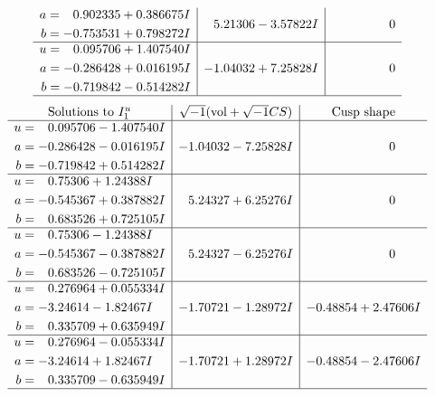 \documentclass[1p]{elsarticle_modified}
\theoremstyle{definition}
\newcommand{\I}{\sqrt{-1}}
\begin{document}
$$\begin{array}{c|c|c}
\begin{aligned}
a &= \phantom{-}0.902335 + 0.386675 I \\
b &= -0.753531 + 0.798272 I\end{aligned}
 & \phantom{-}5.21306 - 3.57822 I & \phantom{-0.000000 } 0 \\ \hline\begin{aligned}
u &= \phantom{-}0.095706 + 1.407540 I \\
a &= -0.286428 + 0.016195 I \\
b &= -0.719842 - 0.514282 I\end{aligned}
 & -1.04032 + 7.25828 I & \phantom{-0.000000 } 0\\
 \hline 
 \end{array}$$\newpage$$\begin{array}{c|c|c}  
\text{Solutions to }I^u_{1}& \I (\text{vol} + \sqrt{-1}CS) & \text{Cusp shape}\\
 \hline 
\begin{aligned}
u &= \phantom{-}0.095706 - 1.407540 I \\
a &= -0.286428 - 0.016195 I \\
b &= -0.719842 + 0.514282 I\end{aligned}
 & -1.04032 - 7.25828 I & \phantom{-0.000000 } 0 \\ \hline\begin{aligned}
u &= \phantom{-}0.75306 + 1.24388 I \\
a &= -0.545367 + 0.387882 I \\
b &= \phantom{-}0.683526 + 0.725105 I\end{aligned}
 & \phantom{-}5.24327 + 6.25276 I & \phantom{-0.000000 } 0 \\ \hline\begin{aligned}
u &= \phantom{-}0.75306 - 1.24388 I \\
a &= -0.545367 - 0.387882 I \\
b &= \phantom{-}0.683526 - 0.725105 I\end{aligned}
 & \phantom{-}5.24327 - 6.25276 I & \phantom{-0.000000 } 0 \\ \hline\begin{aligned}
u &= \phantom{-}0.276964 + 0.055334 I \\
a &= -3.24614 - 1.82467 I \\
b &= \phantom{-}0.335709 + 0.635949 I\end{aligned}
 & -1.70721 - 1.28972 I & -0.48854 + 2.47606 I \\ \hline\begin{aligned}
u &= \phantom{-}0.276964 - 0.055334 I \\
a &= -3.24614 + 1.82467 I \\
b &= \phantom{-}0.335709 - 0.635949 I\end{aligned}
 & -1.70721 + 1.28972 I & -0.48854 - 2.47606 I\\
 \hline 
 \end{array}$$\newpage\newpage\renewcommand{\arraystretch}{1}
\end{document}
